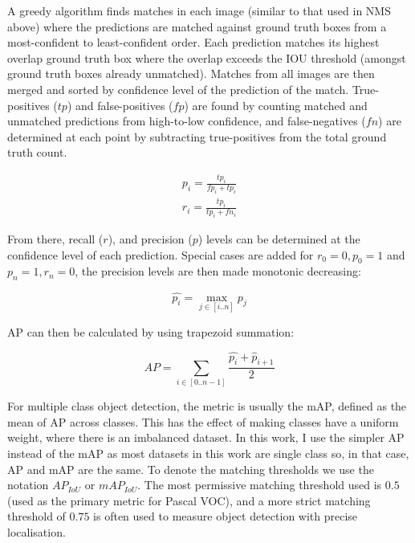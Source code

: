 A greedy algorithm finds matches in each image (similar to that used in \gls{NMS} above) where the predictions are matched against ground truth boxes from a most-confident to least-confident order. Each prediction matches its highest overlap ground truth box where the overlap exceeds the \gls{IOU} threshold (amongst ground truth boxes already unmatched). Matches from all images are then merged and sorted by confidence level of the prediction of the match. True-positives ($tp$) and false-positives ($fp$) are found by counting matched and unmatched predictions from high-to-low confidence, and false-negatives ($fn$) are determined at each point by subtracting true-positives from the total ground truth count. 

\begin{equation*}
\begin{split}
p_i = \frac{tp_i}{fp_i + tp_i}\\
r_i = \frac{tp_i}{tp_i + fn_i}
\end{split}
\label{eq:recall_precision}
\end{equation*}

From there, recall ($r$), and precision ($p$) levels can be determined at the confidence level of each prediction. Special cases are added for $r_0=0, p_0=1$ and $p_n=1, r_n=0$, the precision levels are then made monotonic decreasing:

\begin{equation}
\hat{p_i} = \max_{j \in [i..n]}{p_j}
\label{eq:monotonic_precision}
\end{equation}

\gls{AP} can then be calculated by using trapezoid summation:

\begin{equation}
AP = \sum_{i \in [0..n-1]}\frac{\hat{p_i} + \hat{p}_{i + 1}}{2}
\label{eq:trapezoid}
\end{equation}


For multiple class object detection, the metric is usually the \gls{mAP}, defined as the mean of \gls{AP} across classes. This has the effect of making classes have a uniform weight, where there is an imbalanced dataset.  In this work, I use the simpler \gls{AP} instead of the \gls{mAP} as most datasets in this work are single class so, in that case, \gls{AP} and \gls{mAP} are the same. To denote the matching thresholds we use the notation $AP_{IoU}$ or $mAP_{IoU}$. The most permissive matching threshold used is $0.5$ (used as the primary metric for Pascal VOC), and a more strict matching threshold of $0.75$ is often used to measure object detection with precise localisation.

